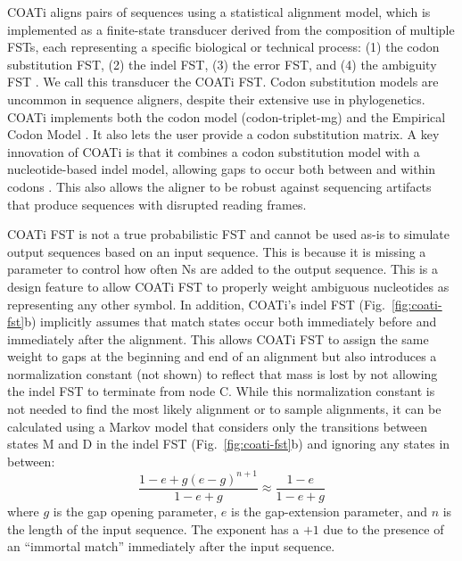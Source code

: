 \documentclass[12pt,letterpaper]{article}
\begin{document}
COATi aligns pairs of sequences using a statistical alignment model, which is implemented as a finite-state transducer derived from the composition of multiple FSTs, each representing a specific biological or technical process: (1) the codon substitution FST, (2) the indel FST, (3) the error FST, and (4) the ambiguity FST \citep[Figs.~\ref{fig:base-calling}--\ref{fig:coati-fst}; cf.][]{holmes2001evolutionary}. We call this transducer the COATi FST. Codon substitution models are uncommon in sequence aligners, despite their extensive use in phylogenetics. COATi implements both the \cite{muse_gaut_1994} codon model (codon-triplet-mg) and the Empirical Codon Model \citep[codon-triplet-ecm;][]{kosiol_ECM_2007}.
It also lets the user provide a codon substitution matrix. A key innovation of COATi is that it combines a codon substitution model with a nucleotide-based indel model, allowing gaps to occur both between and within codons \citep[cf.][]{ranwez_macse_2011,ranwez_macse_2018}. This also allows the aligner to be robust against sequencing artifacts that produce sequences with disrupted reading frames.

COATi FST is not a true probabilistic FST and cannot be used as-is to simulate output sequences based on an input sequence. This is because it is missing a parameter to control how often Ns are added to the output sequence. This is a design feature to allow COATi FST to properly weight ambiguous nucleotides as representing any other symbol. In addition, COATi's indel FST (Fig.~\ref{fig:coati-fst}b) implicitly assumes that match states occur both immediately before and immediately after the alignment. This allows COATi FST to assign the same weight to gaps at the beginning and end of an alignment but also introduces a normalization constant (not shown) to reflect that mass is lost by not allowing the indel FST to terminate from node C. While this normalization constant is not needed to find the most likely alignment or to sample alignments, it can be calculated using a Markov model that considers only the transitions between states M and D in the indel FST (Fig.~\ref{fig:coati-fst}b) and ignoring any states in between:
\[
\frac{1-e + g(e-g)^{n+1}}{1-e+g} \approx \frac{1-e}{1-e+g} 
\]
where $g$ is the gap opening parameter, $e$ is the gap-extension parameter, and $n$ is the length of the input sequence. The exponent has a $+1$ due to the presence of an ``immortal match'' immediately after the input sequence.
\end{document}
